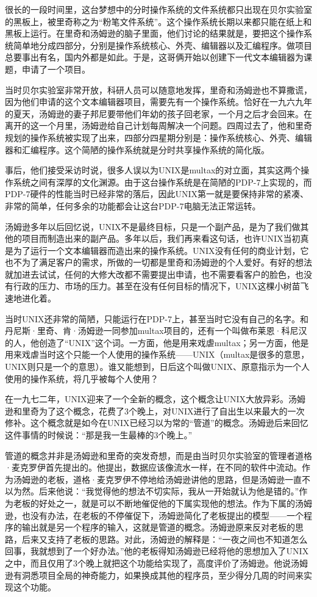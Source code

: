 \documentclass[
  letterpaper,
  DIV=11,
  numbers=noendperiod]{scrreprt}
\begin{document}
很长的一段时间里，这台梦想中的分时操作系统的文件系统都只出现在贝尔实验室的黑板上，被里奇称之为``粉笔文件系统''。这个操作系统长期以来都只能在纸上和黑板上运行。在里奇和汤姆逊的脑子里面，他们讨论的结果就是，要把这个操作系统简单地分成四部分，分别是操作系统核心、外壳、编辑器以及汇编程序。做项目总要事出有名，国内外都是如此。于是，这哥俩开始以创建下一代文本编辑器为课题，申请了一个项目。

当时贝尔实验室非常开放，科研人员可以随意地发挥，里奇和汤姆逊也不算撒谎，因为他们申请的这个文本编辑器项目，需要先有一个操作系统。恰好在一九六九年的夏天，汤姆逊的妻子邦尼要带他们年幼的孩子回老家，一个月之后才会回来。在离开的这一个月里，汤姆逊给自己计划每周解决一个问题。四周过去了，他和里奇规划的操作系统被实现了出来，四部分四星期分别是：操作系统核心、外壳、编辑器和汇编程序。这个简陋的操作系统就是分时共享操作系统的简化版。

事后，他们接受采访时说，很多人误以为UNIX是multax的对立面，其实这两个操作系统之间有深厚的文化渊源。由于这台操作系统是在简陋的PDP-7上实现的，而PDP-7硬件的性能当时已经非常的落后，因此UNIX第一就是要保持非常的紧凑、非常的简单，任何多余的功能都会让这台PDP-7电脑无法正常运转。

汤姆逊多年以后回忆说，UNIX不是最终目标，只是一个副产品，是为了我们做其他的项目而制造出来的副产品。多年以后，我们再来看这句话，也许UNIX当初真是为了运行一个文本编辑器而造出来的操作系统。UNIX没有任何的商业计划，它也不为了满足客户的需求，所做的一切都是里奇和汤姆逊的个人爱好。有好的想法就加进去试试，任何的大修大改都不需要提出申请，也不需要看客户的脸色，也没有行政的压力、市场的压力。甚至在没有任何目标的情况下，UNIX这棵小树苗飞速地进化着。

当时UNIX还非常的简陋，只能运行在PDP-7上，甚至当时它没有自己的名字。和丹尼斯·里奇、肯·汤姆逊一同参加multax项目的，还有一个叫做布莱恩·科尼汉的人，他创造了``UNIX''这个词。一方面，他是用来戏虐multax；另一方面，他是用来戏虐当时这个只能一个人使用的操作系统------UNIX（multax是很多的意思，UNIX则只是一个的意思）。谁又能想到，日后这个叫做UNIX、原意指示为一个人使用的操作系统，将几乎被每个人使用？

在一九七二年，UNIX迎来了一个全新的概念，这个概念让UNIX大放异彩。汤姆逊和里奇为了这个概念，花费了3个晚上，对UNIX进行了自出生以来最大的一次修补。这个概念就是如今在UNIX已经习以为常的``管道''的概念。汤姆逊后来回忆这件事情的时候说：``那是我一生最棒的3个晚上。''

管道的概念并非是汤姆逊和里奇的突发奇想，而是由当时贝尔实验室的管理者道格·麦克罗伊首先提出的。他提出，数据应该像流水一样，在不同的软件中流动。作为汤姆逊的老板，道格·麦克罗伊不停地给汤姆逊讲他的思路，但是汤姆逊一直不以为然。后来他说：``我觉得他的想法不切实际，我从一开始就认为他是错的。''作为老板的好处之一，就是可以不断地催促他的下属实现他的想法。作为下属的汤姆逊，也没有办法，在老板的不停催促下，汤姆逊简化了老板提出的模型------一个程序的输出就是另一个程序的输入，这就是管道的概念。汤姆逊原来反对老板的思路，后来又支持了老板的思路。对此，汤姆逊的解释是：``一夜之间也不知道怎么回事，我就想到了一个好办法。''他的老板得知汤姆逊已经将他的思想加入了UNIX之中，而且仅用了3个晚上就把这个功能给实现了，高度评价了汤姆逊。他说汤姆逊有洞悉项目全局的神奇能力，如果换成其他的程序员，至少得分几周的时间来实现这个功能。
\end{document}
